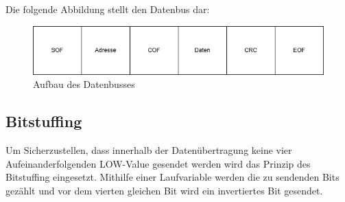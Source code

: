Die folgende Abbildung stellt den Datenbus dar:
\begin{figure}[H]
	\centering    
	\includegraphics[width=1\textwidth]{Bilder/datenbus.png}
	\caption{Aufbau des Datenbusses}
	\label{Datenbus}
\end{figure}

\subsection{Bitstuffing}
Um Sicherzustellen, dass innerhalb der Datenübertragung keine vier Aufeinanderfolgenden LOW-Value gesendet werden wird das Prinzip des Bitstuffing eingesetzt. Mithilfe einer Laufvariable werden die zu sendenden Bits gezählt und vor dem vierten gleichen Bit wird ein invertiertes Bit gesendet.